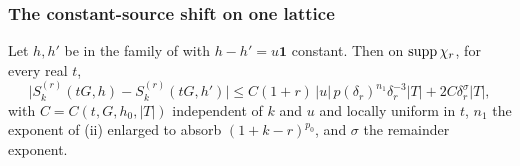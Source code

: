 
\subsubsection*{The constant-source shift on one lattice}

\begin{lemma}\label{rot:lem:H6SD}
Let $h,h'$ be in the family of  with $h-h'=u\mathbf 1$ constant. Then on $\operatorname{supp}\chi_r$, for every real $t$,
\begin{equation}\label{rot:eq:H6SD}
\big|S^{(r)}_k(tG,h)-S^{(r)}_k(tG,h')\big|\le C(1+r)\,|u|\,p(\delta_r)^{n_1}\delta_r^{-3}|T|+2C\delta_r^\sigma|T|,
\end{equation}
with $C=C(t,G,h_0,|T|)$ independent of $k$ and $u$ and locally uniform in $t$, $n_1$ the exponent of (ii) enlarged to absorb $(1+k-r)^{p_0}$, and $\sigma$ the remainder exponent.
\end{lemma}
